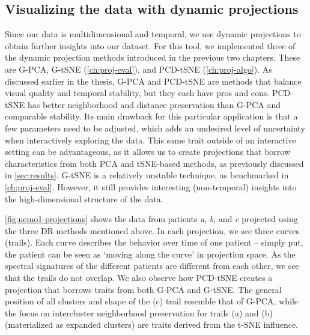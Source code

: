 \subsection{Visualizing the data with dynamic projections}
\label{sec:nemo_pipeline_dr}
%
Since our data is multidimensional and temporal, we use dynamic projections to obtain further insights into our dataset.
For this tool, we implemented three of the dynamic projection methods introduced in the previous two chapters. These are G-PCA, G-tSNE (\cref{ch:proj-eval}), and PCD-tSNE (\cref{ch:proj-algo}). 
As discussed earlier in the thesis, G-PCA and PCD-tSNE are methods that balance visual quality and temporal stability, but they each have pros and cons. PCD-tSNE has better neighborhood and distance preservation than G-PCA and comparable stability. Its main drawback for this particular application is that a few parameters need to be adjusted, which adds an undesired level of uncertainty when interactively exploring the data. This same trait outside of an interactive setting can be advantageous, as it allows us to create projections that borrow characteristics from both PCA and tSNE-based methods, as previously discussed in \cref{sec:results}. %
G-tSNE is a relatively unstable technique, as benchmarked in \cref{ch:proj-eval}. However, it still provides interesting (non-temporal) insights into the high-dimensional structure of the data.

\cref{fig:nemo1-projections} shows the data from patients \textit{a}, \textit{b}, and \textit{c} projected using the three DR methods mentioned above. In each projection, we see three curves (trails). Each curve describes the behavior over time of one patient -- simply put, the patient can be seen as `moving along the curve' in projection space. As the spectral signatures of the different patients are different from each other, we see that the trails do not overlap. We also observe how PCD-tSNE creates a projection that borrows traits from both G-PCA and G-tSNE. The general position of all clusters and shape of the (c) trail resemble that of G-PCA, while the focus on intercluster neighborhood preservation for trails (a) and (b) (materialized as expanded clusters) are traits derived from the t-SNE influence.

